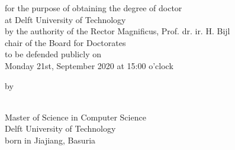 \begin{small}

\begin{center}for the purpose of obtaining the degree of doctor\\
\vspace{1mm}
at Delft University of Technology\\
\vspace{1mm}
by the authority of the Rector Magnificus, Prof. dr. ir. H. Bijl\\
\vspace{1mm}
chair of the Board for Doctorates\\
\vspace{1mm}
to be defended publicly on\\
\vspace{1mm}
Monday 21st, September 2020 at 15:00 o'clock
\vspace{1mm}
\vspace{10mm} %

by

\vspace{10mm}
\textbf{\theauthor}\\
\vspace{1mm}
Master of Science in Computer Science\\
\vspace{1mm}
Delft University of Technology\\
\vspace{1mm}
born in Jiajiang, Basuria
\vspace{1mm}
\end{center}

\end{small}


